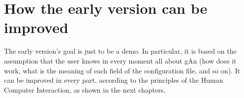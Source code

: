 \section{How the early version can be improved}
The early version's goal is just to be a demo. In particular, it is based on the assumption that the user knows in every moment all about gAn (how does it work,  what is the meaning of each field of the configuration file, and so on). It can be improved in every part, according to the principles of the Human Computer Interaction, as shown in the next chapters.

